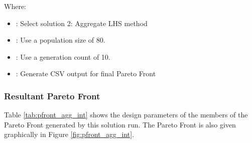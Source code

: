 \noindent Where: 

\begin{itemize}
  \item {}: Select solution 2: Aggregate LHS method
  \item {}: Use a population size of 80. 
  \item {}: Use a generation count of 10. 
  \item {}: Generate CSV output for final Pareto Front
\end{itemize}

\subsubsection{Resultant Pareto Front}
Table \ref{tab:pfront_agg_int} shows the design parameters of the members of the Pareto Front generated by this solution run. The Pareto Front is also given graphically in Figure \ref{fig:pfront_agg_int}. 
